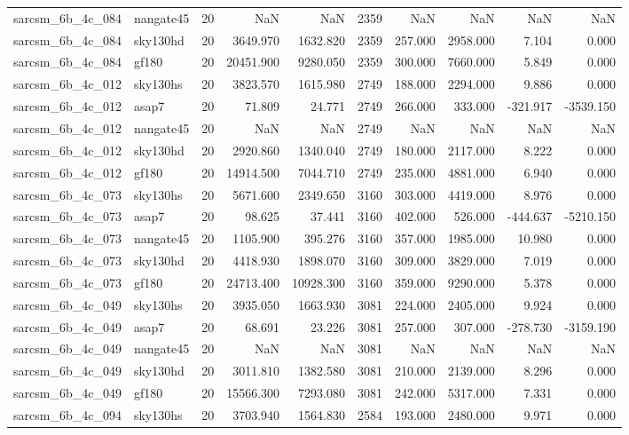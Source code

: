 \begin{tabular}{llrrrrrrrr}
sarcsm\_6b\_4c\_084 & nangate45 & 20 & NaN & NaN & 2359 & NaN & NaN & NaN & NaN \\
sarcsm\_6b\_4c\_084 & sky130hd & 20 & 3649.970 & 1632.820 & 2359 & 257.000 & 2958.000 & 7.104 & 0.000 \\
sarcsm\_6b\_4c\_084 & gf180 & 20 & 20451.900 & 9280.050 & 2359 & 300.000 & 7660.000 & 5.849 & 0.000 \\
sarcsm\_6b\_4c\_012 & sky130hs & 20 & 3823.570 & 1615.980 & 2749 & 188.000 & 2294.000 & 9.886 & 0.000 \\
sarcsm\_6b\_4c\_012 & asap7 & 20 & 71.809 & 24.771 & 2749 & 266.000 & 333.000 & -321.917 & -3539.150 \\
sarcsm\_6b\_4c\_012 & nangate45 & 20 & NaN & NaN & 2749 & NaN & NaN & NaN & NaN \\
sarcsm\_6b\_4c\_012 & sky130hd & 20 & 2920.860 & 1340.040 & 2749 & 180.000 & 2117.000 & 8.222 & 0.000 \\
sarcsm\_6b\_4c\_012 & gf180 & 20 & 14914.500 & 7044.710 & 2749 & 235.000 & 4881.000 & 6.940 & 0.000 \\
sarcsm\_6b\_4c\_073 & sky130hs & 20 & 5671.600 & 2349.650 & 3160 & 303.000 & 4419.000 & 8.976 & 0.000 \\
sarcsm\_6b\_4c\_073 & asap7 & 20 & 98.625 & 37.441 & 3160 & 402.000 & 526.000 & -444.637 & -5210.150 \\
sarcsm\_6b\_4c\_073 & nangate45 & 20 & 1105.900 & 395.276 & 3160 & 357.000 & 1985.000 & 10.980 & 0.000 \\
sarcsm\_6b\_4c\_073 & sky130hd & 20 & 4418.930 & 1898.070 & 3160 & 309.000 & 3829.000 & 7.019 & 0.000 \\
sarcsm\_6b\_4c\_073 & gf180 & 20 & 24713.400 & 10928.300 & 3160 & 359.000 & 9290.000 & 5.378 & 0.000 \\
sarcsm\_6b\_4c\_049 & sky130hs & 20 & 3935.050 & 1663.930 & 3081 & 224.000 & 2405.000 & 9.924 & 0.000 \\
sarcsm\_6b\_4c\_049 & asap7 & 20 & 68.691 & 23.226 & 3081 & 257.000 & 307.000 & -278.730 & -3159.190 \\
sarcsm\_6b\_4c\_049 & nangate45 & 20 & NaN & NaN & 3081 & NaN & NaN & NaN & NaN \\
sarcsm\_6b\_4c\_049 & sky130hd & 20 & 3011.810 & 1382.580 & 3081 & 210.000 & 2139.000 & 8.296 & 0.000 \\
sarcsm\_6b\_4c\_049 & gf180 & 20 & 15566.300 & 7293.080 & 3081 & 242.000 & 5317.000 & 7.331 & 0.000 \\
sarcsm\_6b\_4c\_094 & sky130hs & 20 & 3703.940 & 1564.830 & 2584 & 193.000 & 2480.000 & 9.971 & 0.000 \\

\end{tabular}
